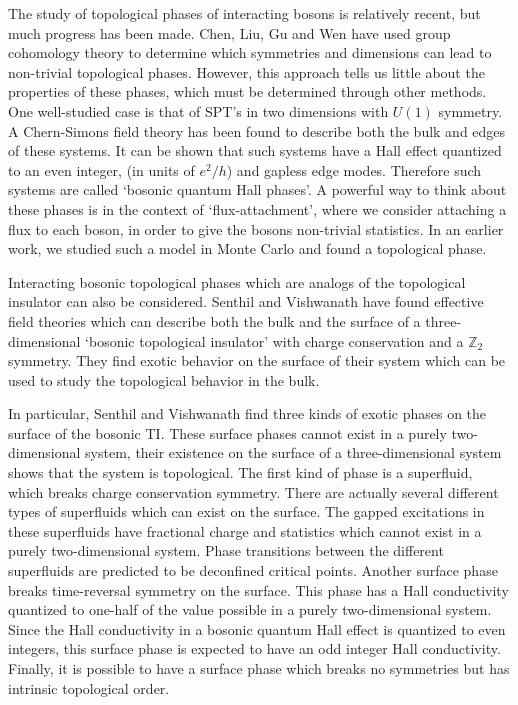 \documentclass[prb,twocolumn]{revtex4-1}
\begin{document}
The study of topological phases of interacting bosons is relatively recent, but much progress has been made. Chen, Liu, Gu and Wen\cite{WenScience,*WenPRB} have used group cohomology theory to determine which symmetries and dimensions can lead to non-trivial topological phases. However, this approach tells us little about the properties of these phases, which must be determined through other methods. One well-studied case is that of SPT's in two dimensions with $U(1)$ symmetry. A Chern-Simons field theory has been found to describe both the bulk and edges of these systems.\cite{LuVishwanath} It can be shown that such systems have a Hall effect quantized to an even integer, (in units of $e^2/h$) and gapless edge modes. Therefore such systems are called `bosonic quantum Hall phases'. A powerful way to think about these phases is in the context of `flux-attachment', where we consider attaching a flux to each boson, in order to give the bosons non-trivial statistics.\cite{SenthilLevin} 
In an earlier work, we studied such a model in Monte Carlo and found a topological phase.\cite{FQHE}

Interacting bosonic topological phases which are analogs of the topological insulator can also be considered. Senthil and Vishwanath\cite{SenthilVishwanath} have found effective field theories which can describe both the bulk and the surface of a three-dimensional `bosonic topological insulator' with charge conservation and a $\mathbb{Z}_2$ symmetry. They find exotic behavior on the surface of their system which can be used to study the topological behavior in the bulk. 

In particular, Senthil and Vishwanath find three kinds of exotic phases on the surface of the bosonic TI. These surface phases cannot exist in a purely two-dimensional system, their existence on the surface of a three-dimensional system shows that the system is topological. The first kind of phase is a superfluid, which breaks charge conservation symmetry. There are actually several different types of superfluids which can exist on the surface. The gapped excitations in these superfluids have fractional charge and statistics which cannot exist in a purely two-dimensional system.  Phase transitions between the different superfluids are predicted to be deconfined critical points. Another surface phase breaks time-reversal symmetry on the surface. This phase has a Hall conductivity quantized to one-half of the value possible in a purely two-dimensional system. Since the Hall conductivity in a bosonic quantum Hall effect is quantized to even integers, this surface phase is expected to have an odd integer Hall conductivity. Finally, it is possible to have a surface phase which breaks no symmetries but has intrinsic topological order.
\end{document}
